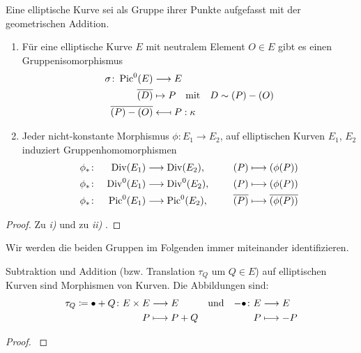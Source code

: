\begin{Satz}\label{gruppenaequivalenz}
  Eine elliptische Kurve sei als Gruppe ihrer Punkte aufgefasst
  mit der geometrischen Addition.
  \begin{enumerate}[label=\roman*)]
  \item 
    Für eine elliptische Kurve $E$ mit neutralem Element $O\in E$ gibt
    es einen Gruppenisomorphismus
    \begin{align*}
      \sigma\colon \operatorname{Pic}^0(E) &\longrightarrow E\\
      \overline{(D)} &\mapsto P
                       \quad\text{mit}\quad D\sim (P)-(O)\\
      \overline{(P)-(O)} &\longmapsfrom P : \kappa
    \end{align*}

  \item
    Jeder nicht-konstante Morphismus $\phi\colon E_1\to E_2$, 
    auf elliptischen Kurven $E_1$, $E_2$ induziert Gruppenhomomorphismen
    \begin{alignat*}{3}
      &\phi_*\colon& \operatorname{Div}(E_1) 
      &\longrightarrow \operatorname{Div}(E_2),
      \qquad
      &(P) &\longmapsto (\phi(P))\\
      &\phi_*\colon& \operatorname{Div}^0(E_1) 
      &\longrightarrow \operatorname{Div}^0(E_2),
      &(P) &\longmapsto (\phi(P))\\
      &\phi_*\colon& \operatorname{Pic}^0(E_1) 
      &\longrightarrow \operatorname{Pic}^0(E_2),
      &\overline{(P)} &\longmapsto \overline{(\phi(P))}\\
    \end{alignat*}
  \end{enumerate}
  \begin{proof}
    Zu \emph{i)} \cite[siehe][Proposition III.3.4]{silverman} und
    zu \emph{ii)} \cite[siehe][Remark II.3.7]{silverman}.
  \end{proof}
\end{Satz}
Wir werden die beiden Gruppen im Folgenden immer miteinander
identifizieren.


\begin{Satz}\label{additionmorphismus}
  Subtraktion und Addition (bzw. Translation $\tau_Q$ um $Q\in E$) auf
  elliptischen Kurven sind Morphismen von Kurven. Die Abbildungen sind:
  \begin{align*}
    \tau_Q\coloneqq\bullet+Q\colon E\times E&\longrightarrow E  
    &&\text{und}  
    &-\bullet\colon E&\longrightarrow E \\
    P&\longmapsto P+Q             
    &&&P&\longmapsto -P
  \end{align*}
  \begin{proof}
    \cite[siehe][Theorem III.3.6]{silverman}
  \end{proof}
\end{Satz}


